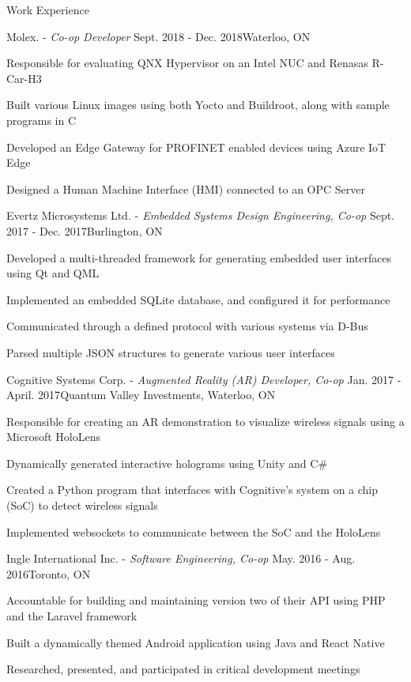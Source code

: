 \documentclass{resume}
\begin{document}
\begin{rSection}{Work Experience}
\begin{rSubsection}{Molex. -\em{ Co-op Developer}}
{Sept. 2018 - Dec. 2018}{Waterloo, ON}{ }
\item Responsible for evaluating QNX Hypervisor on an Intel NUC and Renasas R-Car-H3 
\item Built various Linux images using both Yocto and Buildroot, along with sample programs in C
\item Developed an Edge Gateway for PROFINET enabled devices using Azure IoT Edge
\item Designed a Human Machine Interface (HMI) connected to an OPC Server
\end{rSubsection}
\begin{rSubsection}{Evertz Microsystems Ltd. -\em{ Embedded Systems Design Engineering, Co-op}}
{Sept. 2017 - Dec. 2017}{Burlington, ON}{ }
\item Developed a multi-threaded framework for generating embedded user interfaces using Qt and QML
\item Implemented an embedded SQLite database, and configured it for performance
\item Communicated through a defined protocol with various systems via D-Bus 
\item Parsed multiple JSON structures to generate various user interfaces
\end{rSubsection}
\begin{rSubsection}{Cognitive Systems Corp. -\em{ Augmented Reality (AR) Developer, Co-op}}
{Jan. 2017 - April. 2017}{Quantum Valley Investments, Waterloo, ON}{ }
\item Responsible for creating an AR demonstration to visualize wireless signals using a Microsoft HoloLens
\item Dynamically generated interactive holograms using Unity and C\#
\item Created a Python program that interfaces with Cognitive's system on a chip (SoC) to detect wireless signals
\item Implemented websockets to communicate between the SoC and the HoloLens
\end{rSubsection}

\begin{rSubsection}{Ingle International Inc. -\em{ Software Engineering, Co-op}}
{May. 2016 - Aug. 2016}{Toronto, ON}{ }
\item Accountable for building and maintaining version two of their API using PHP and the Laravel framework
\item Built a dynamically themed Android application using Java and React Native
\item Researched, presented, and participated in critical development meetings
\end{rSubsection}


\end{rSection}
\end{document}
